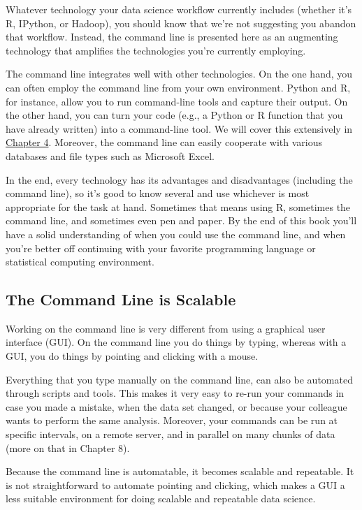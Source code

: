 \documentclass[
]{book}
\theoremstyle{definition}
\theoremstyle{definition}
\theoremstyle{definition}
\theoremstyle{remark}
\begin{document}
Whatever technology your data science workflow currently includes (whether it's R, IPython, or Hadoop), you should know that we're not suggesting you abandon that workflow. Instead, the command line is presented here as an augmenting technology that amplifies the technologies you're currently employing.

The command line integrates well with other technologies. On the one hand, you can often employ the command line from your own environment. Python and R, for instance, allow you to run command-line tools and capture their output. On the other hand, you can turn your code (e.g., a Python or R function that you have already written) into a command-line tool. We will cover this extensively in \protect\hyperlink{chapter-4-creating-reusable-command-line-tools}{Chapter 4}. Moreover, the command line can easily cooperate with various databases and file types such as Microsoft Excel.

In the end, every technology has its advantages and disadvantages (including the command line), so it's good to know several and use whichever is most appropriate for the task at hand. Sometimes that means using R, sometimes the command line, and sometimes even pen and paper. By the end of this book you'll have a solid understanding of when you could use the command line, and when you're better off continuing with your favorite programming language or statistical computing environment.

\hypertarget{the-command-line-is-scalable}{%
\subsection{The Command Line is Scalable}\label{the-command-line-is-scalable}}

Working on the command line is very different from using a graphical user interface (GUI). On the command line you do things by typing, whereas with a GUI, you do things by pointing and clicking with a mouse.

Everything that you type manually on the command line, can also be automated through scripts and tools. This makes it very easy to re-run your commands in case you made a mistake, when the data set changed, or because your colleague wants to perform the same analysis. Moreover, your commands can be run at specific intervals, on a remote server, and in parallel on many chunks of data (more on that in Chapter 8).

Because the command line is automatable, it becomes scalable and repeatable. It is not straightforward to automate pointing and clicking, which makes a GUI a less suitable environment for doing scalable and repeatable data science.
\end{document}
